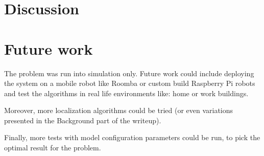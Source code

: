 \documentclass[10pt,journal,compsoc]{IEEEtran}
\begin{document}
    \section{Discussion}

    \section{Future work}

    The problem was run into simulation only. Future work could include deploying the system on a mobile robot like Roomba or custom build Raspberry Pi robots and test the algorithms in real life environments like: home or work buildings.

    Moreover, more localization algorithms could be tried (or even variations presented in the Background part of the writeup).

    Finally, more tests with model configuration parameters could be run, to pick the optimal result for the problem.
    
   
   
\end{document}

